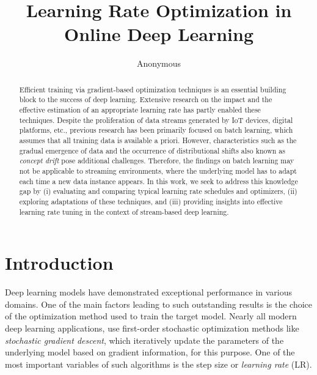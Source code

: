 \documentclass[runningheads]{llncs}
\begin{document}
%
\title{Learning Rate Optimization in Online Deep Learning}
%
%
\author{Anonymous}
%
%
%

\maketitle
%
\begin{abstract}
	Efficient training via gradient-based optimization techniques is an essential building block to the success of deep learning. Extensive research on the impact and the effective estimation of an appropriate learning rate has partly enabled these techniques. Despite the proliferation of data streams generated by IoT devices, digital platforms, etc., previous research has been primarily focused on batch learning, which assumes that all training data is available a priori. However, characteristics such as the gradual emergence of data and the occurrence of distributional shifts also known as \textit{concept drift} pose additional challenges. Therefore, the findings on batch learning may not be applicable to streaming environments, where the underlying model has to adapt each time a new data instance appears. In this work, we seek to address this knowledge gap by (i) evaluating and comparing typical learning rate schedules and optimizers, (ii) exploring adaptations of these techniques, and (iii) providing insights into effective learning rate tuning in the context of stream-based deep learning.

\end{abstract}
%
%
%
\section{Introduction}
Deep learning models have demonstrated exceptional performance in various domains.
One of the main factors leading to such outstanding results is the choice of the optimization method used to train the target model.
Nearly all modern deep learning applications, use first-order stochastic optimization methods like \textit{stochastic gradient descent}, which iteratively update the parameters of the underlying model based on gradient information, for this purpose.
One of the most important variables of such algorithms is the step size or \textit{learning rate} (LR).
\end{document}

